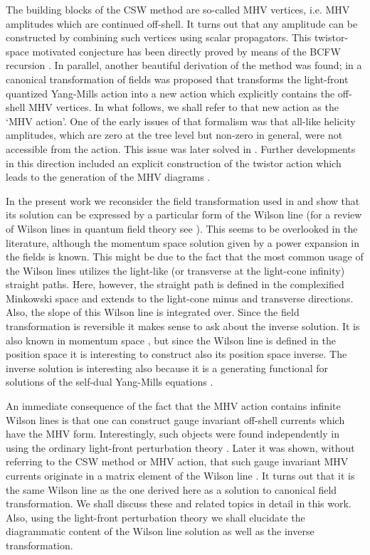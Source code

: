 \documentclass[english,american]{article}
\begin{document}
The building blocks of the CSW method are so-called MHV vertices,
i.e. MHV amplitudes which are continued off-shell. It turns out that any amplitude
can be constructed by combining such vertices using scalar propagators.
This twistor-space motivated conjecture has been directly proved by
means of the BCFW recursion \citep{Britto:2005fq,Risager2005}. In
parallel, another beautiful derivation of the method was found; in
\citep{Mansfield2006} a canonical transformation of fields was proposed
that transforms the light-front quantized Yang-Mills action into a
new action which explicitly contains the off-shell MHV vertices. In what
follows, we shall refer to that new action as the `MHV action'. One
of the early issues of that formalism was that all-like helicity amplitudes,
which are zero at the tree level but non-zero in general, were not accessible
from the action. This issue was later solved in \citep{Ettle2006b,Ettle2007,Brandhuber2007,Ettle2008}.
Further developments  in this direction included an explicit construction of the twistor action which leads to the generation of the MHV diagrams \citep{Boels:2007qn}. 

In the present work we reconsider the field transformation used in
\citep{Mansfield2006} and show that its solution can be expressed
by a particular form of the Wilson line (for a review of Wilson lines
in quantum field theory see \citep{Cherednikov2014}). This seems
to be overlooked in the literature, although the momentum space solution
given by a power expansion in the fields is known. This might be due to the fact
that the most common usage of the Wilson lines utilizes the light-like (or transverse
at the light-cone infinity) straight paths. Here, however, the straight
path is defined in the complexified Minkowski space and extends to the
light-cone minus and transverse directions. Also, the slope of this Wilson line is integrated over. Since the field transformation
is reversible it makes sense to ask about the inverse solution. It
is also known in momentum space \citep{Ettle2006b}, but since the
Wilson line is defined in the position space it is interesting to construct
also its position space inverse. The inverse solution is interesting
also because it is a generating functional for solutions of the self-dual
Yang-Mills equations \citep{Bardeen1996,Rosly1997,Gorsky2006}.

An immediate consequence of the fact that the MHV action contains
infinite Wilson lines is that one can construct gauge invariant off-shell
currents which have the MHV form. Interestingly, such objects were
found independently in \citep{Cruz-Santiago2013} using the ordinary
light-front perturbation theory \citep{Kogut1970,Brodsky1998}. Later
it was shown, without referring to the CSW method or MHV action, that
such gauge invariant MHV currents originate in a matrix element of
the Wilson line \citep{Cruz-Santiago2015,Kotko2016}. It turns out that
it is the same Wilson line as the one derived here as a solution to
canonical field transformation.  We shall discuss these and related topics in detail in this work. Also, using the light-front perturbation theory we shall elucidate the diagrammatic content of the Wilson line solution as well as the inverse transformation.
\end{document}
